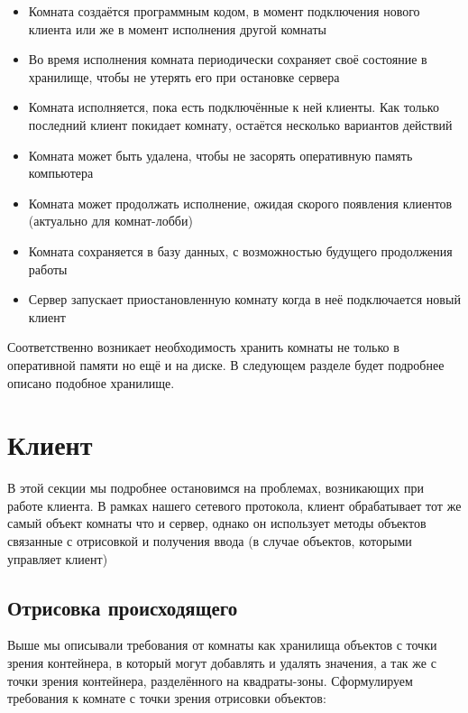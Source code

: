 \documentclass[a4paper,14pt, openany]{book}
\begin{document}
\begin {itemize}
   \item Комната создаётся программным кодом, в момент подключения нового клиента или же в момент исполнения другой комнаты
   \item Во время исполнения комната периодически сохраняет своё состояние в хранилище, чтобы не утерять его при остановке сервера
   \item Комната исполняется, пока есть подключённые к ней клиенты. Как только последний клиент покидает комнату, остаётся несколько вариантов действий
   \item Комната может быть удалена, чтобы не засорять оперативную память компьютера 
   \item Комната может продолжать исполнение, ожидая скорого появления клиентов (актуально для комнат-лобби)
   \item Комната сохраняется в базу данных, с возможностью будущего продолжения работы
   \item Сервер запускает приостановленную комнату когда в неё подключается новый клиент
\end{itemize}

Соответственно возникает необходимость хранить комнаты не только в оперативной памяти но ещё и на диске. В следующем разделе будет подробнее описано подобное хранилище.

\section {Клиент}

В этой секции мы подробнее остановимся на проблемах, возникающих при работе клиента. В рамках нашего сетевого протокола, клиент обрабатывает тот же самый объект комнаты что и сервер, однако он использует методы объектов связанные с отрисовкой и получения ввода (в случае объектов, которыми управляет клиент)

\subsection{Отрисовка происходящего}

Выше мы описывали требования от комнаты как хранилища объектов с точки зрения контейнера, в который могут добавлять и удалять значения, а так же с точки зрения контейнера, разделённого на квадраты-зоны. Сформулируем требования к комнате с точки зрения отрисовки объектов:
\end{document}
